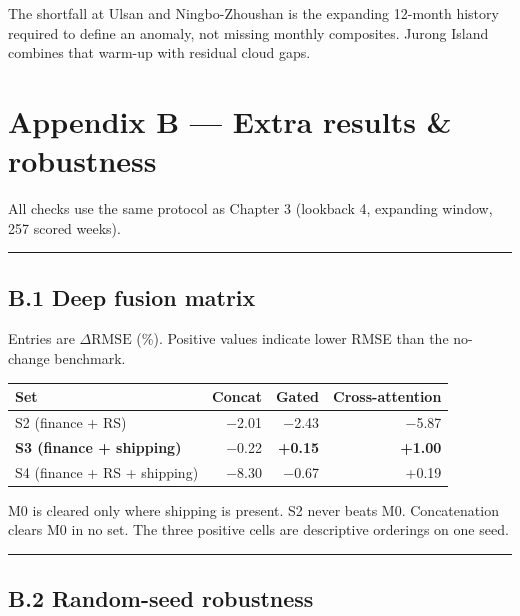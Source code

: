 \documentclass[
  british,
  12pt,
  oneside]{book}
\newcounter{none} %
\begin{document}
{The shortfall at Ulsan and Ningbo-Zhoushan is the expanding 12-month history
required to define an anomaly, not missing monthly composites. Jurong Island
combines that warm-up with residual cloud gaps.

\chapter*{Appendix B --- Extra results \& robustness}\label{appendix-b-extra-results-robustness}


All checks use the same protocol as Chapter 3 (lookback 4, expanding window, 257
scored weeks).

\begin{center}\rule{0.5\linewidth}{0.5pt}\end{center}

\section*{B.1 Deep fusion matrix}\label{b.1-deep-fusion-matrix}

Entries are \(\Delta\mathrm{RMSE}\) (\%).
Positive values indicate lower RMSE than the no-change benchmark.

{\def\LTcaptype{none} %
\begin{longtable}[]{@{}lrrr@{}}
\toprule\noalign{}
Set & Concat & Gated & Cross-attention \\
\midrule\noalign{}
\endhead
\bottomrule\noalign{}
\endlastfoot
S2 (finance + RS) & −2.01 & −2.43 & −5.87 \\
\textbf{S3 (finance + shipping)} & −0.22 & \textbf{+0.15} & \textbf{+1.00} \\
S4 (finance + RS + shipping) & −8.30 & −0.67 & +0.19 \\
\end{longtable}
}

M0 is cleared only where shipping is present. S2 never beats M0.
Concatenation clears M0 in no set. The three positive cells are descriptive
orderings on one seed.

\begin{center}\rule{0.5\linewidth}{0.5pt}\end{center}

\section*{B.2 Random-seed robustness}\label{b.2-random-seed-robustness}

}
\end{document}
